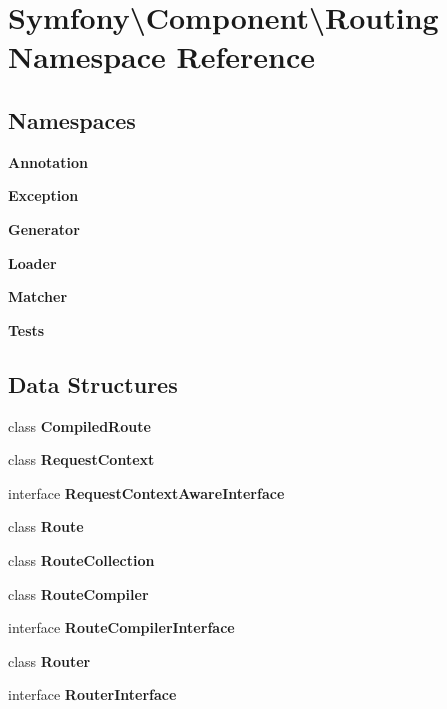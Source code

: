 \section{Symfony\textbackslash{}Component\textbackslash{}Routing Namespace Reference}
\label{namespace_symfony_1_1_component_1_1_routing}
\subsection*{Namespaces}
\begin{DoxyCompactItemize}
\item 
 {\bf Annotation}
\item 
 {\bf Exception}
\item 
 {\bf Generator}
\item 
 {\bf Loader}
\item 
 {\bf Matcher}
\item 
 {\bf Tests}
\end{DoxyCompactItemize}
\subsection*{Data Structures}
\begin{DoxyCompactItemize}
\item 
class {\bf Compiled\+Route}
\item 
class {\bf Request\+Context}
\item 
interface {\bf Request\+Context\+Aware\+Interface}
\item 
class {\bf Route}
\item 
class {\bf Route\+Collection}
\item 
class {\bf Route\+Compiler}
\item 
interface {\bf Route\+Compiler\+Interface}
\item 
class {\bf Router}
\item 
interface {\bf Router\+Interface}
\end{DoxyCompactItemize}
